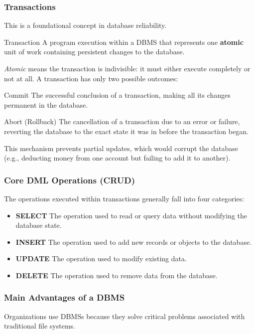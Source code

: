 \subsubsection{Transactions}
This is a foundational concept in database reliability. 

\begin{defbox}{Transaction}
A program execution within a DBMS that represents one \textbf{atomic} unit of work containing persistent changes to the database.
\end{defbox}

\textit{Atomic} means the transaction is indivisible: it must either execute completely or not at all. A transaction has only two possible outcomes:

\begin{defbox}{Commit}
The successful conclusion of a transaction, making all its changes permanent in the database.
\end{defbox}

\begin{defbox}{Abort (Rollback)}
The cancellation of a transaction due to an error or failure, reverting the database to the exact state it was in before the transaction began.
\end{defbox}

This mechanism prevents partial updates, which would corrupt the database (e.g., deducting money from one account but failing to add it to another).

\subsubsection{Core DML Operations (CRUD)}
The operations executed within transactions generally fall into four categories:

\begin{itemize}
\item \textbf{SELECT}
The operation used to read or query data without modifying the database state.
\item \textbf{INSERT}
The operation used to add new records or objects to the database.
\item \textbf{UPDATE}
The operation used to modify existing data.
\item \textbf{DELETE}
The operation used to remove data from the database.
\end{itemize}

\subsubsection{Main Advantages of a DBMS}
Organizations use DBMSs because they solve critical problems associated with traditional file systems.


